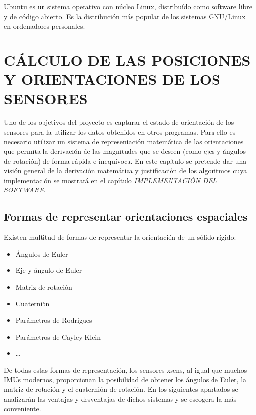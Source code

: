 \documentclass[12pt, a4paper]{report}
\begin{document}
Ubuntu es un sistema operativo con núcleo Linux, distribuído como software libre y de código abierto. Es la distribución más popular de los sistemas GNU/Linux en ordenadores personales.






\chapter{CÁLCULO DE LAS POSICIONES Y ORIENTACIONES DE LOS SENSORES}

Uno de los objetivos del proyecto es capturar el estado de orientación de los sensores para la utilizar los datos obtenidos en otros programas. Para ello es necesario utilizar un sistema de representación matemática de las orientaciones que permita la derivación de las magnitudes que se deseen (como ejes y ángulos de rotación) de forma rápida e inequívoca. En este capítulo se pretende dar una visión general de la derivación matemática y justificación de los algoritmos cuya implementación se mostrará en el capítulo \textit{IMPLEMENTACIÓN DEL SOFTWARE}.

\section{Formas de representar orientaciones espaciales}

Existen multitud de formas de representar la orientación de un sólido rígido:

\begin{itemize}

\item Ángulos de Euler
\item Eje y ángulo de Euler
\item Matriz de rotación
\item Cuaternión
\item Parámetros de Rodrigues
\item Parámetros de Cayley-Klein
\item \ldots

\end{itemize}

De todas estas formas de representación, los sensores xsens, al igual que muchos IMUs modernos, proporcionan la posibilidad de obtener los ángulos de Euler, la matriz de rotación y el cuaternión de rotación. En los siguientes apartados se analizarán las ventajas y desventajas de dichos sistemas y se escogerá la más conveniente.
\end{document}
